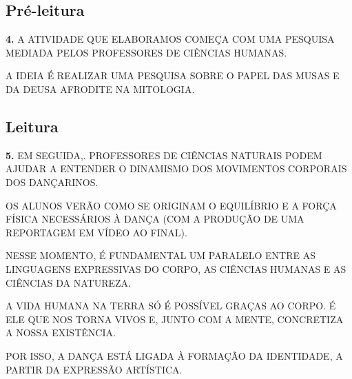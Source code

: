 \documentclass{extarticle}
\begin{document}

\subsection{Pré-leitura}

\textbf{4.} A ATIVIDADE QUE ELABORAMOS COMEÇA COM UMA PESQUISA MEDIADA
PELOS PROFESSORES DE CIÊNCIAS HUMANAS.
 
A IDEIA É REALIZAR UMA PESQUISA SOBRE O PAPEL DAS MUSAS E DA DEUSA
AFRODITE NA MITOLOGIA.
 
 






\subsection{Leitura}

\textbf{5.} EM SEGUIDA,. PROFESSORES DE CIÊNCIAS NATURAIS PODEM AJUDAR A
ENTENDER O DINAMISMO DOS MOVIMENTOS CORPORAIS DOS DANÇARINOS.
 
OS ALUNOS VERÃO COMO SE ORIGINAM O EQUILÍBRIO E A FORÇA FÍSICA
NECESSÁRIOS À DANÇA (COM A PRODUÇÃO DE UMA REPORTAGEM EM VÍDEO AO
FINAL).
 
NESSE MOMENTO, É FUNDAMENTAL UM PARALELO ENTRE AS LINGUAGENS EXPRESSIVAS
DO CORPO, AS CIÊNCIAS HUMANAS E AS CIÊNCIAS DA NATUREZA.
 
A VIDA HUMANA NA TERRA SÓ É POSSÍVEL GRAÇAS AO CORPO. É ELE QUE NOS
TORNA VIVOS E, JUNTO COM A MENTE, CONCRETIZA A NOSSA EXISTÊNCIA.~
 
POR ISSO, A DANÇA ESTÁ LIGADA À FORMAÇÃO DA IDENTIDADE, A PARTIR DA
EXPRESSÃO ARTÍSTICA.~
 
\end{document}

